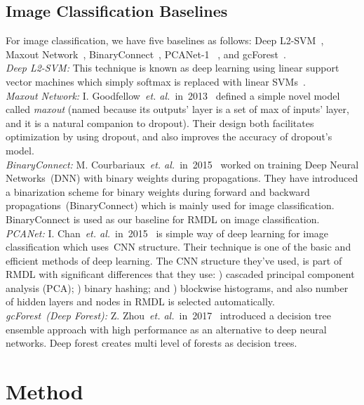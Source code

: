 \documentclass[sigconf, final]{acmart}
\newcommand{\RNum}[1]{%
  \textup{\uppercase\expandafter{\romannumeral#1}}%
}
\begin{document}
\vspace{-0.1in}\subsection{Image Classification Baselines}\label{subsec:baseline_image}
For image classification, we have five baselines as follows: Deep L2-SVM~\cite{tang2013deep}, Maxout Network~\cite{goodfellow2013maxout}, BinaryConnect~\cite{courbariaux2015binaryconnect}, PCANet-1 ~\cite{chan2015pcanet}, and gcForest~\cite{zhou2017deep}.\\
\textit{Deep L2-SVM:} This technique is known as deep learning using linear support vector machines which simply softmax is replaced with linear SVMs~\cite{tang2013deep}.
\\ \textit{Maxout Network:} I. Goodfellow~\textit{et. al.}~in~2013~\cite{goodfellow2013maxout} defined a simple novel model called \textit{maxout} (named because its outputs' layer is a set of max of inputs' layer, and it is a natural companion to dropout). Their design both facilitates optimization by using dropout, and also improves the accuracy of dropout's model.\\
\textit{BinaryConnect:} M. Courbariaux~\textit{et. al.}~in~2015~\cite{courbariaux2015binaryconnect} worked on training Deep Neural Networks~(DNN) with binary weights during propagations. They have introduced a binarization scheme for binary weights during forward and backward propagations~(\textup{BinaryConnect}) which is mainly used for image classification. BinaryConnect is used as our baseline for RMDL on image classification.\\ \textit{PCANet:} I. Chan~\textit{et. al.}~in~2015~\cite{chan2015pcanet} is simple way of deep learning for image classification which uses~CNN structure. Their technique is one of the basic and efficient methods of deep learning. The CNN structure they've used, is part of RMDL with significant differences that they use: \RNum{1}) cascaded principal component analysis (PCA); \RNum{2}) binary hashing; and  \RNum{3}) blockwise histograms, and also number of hidden layers and nodes in RMDL is selected automatically.\\ \textit{gcForest~(Deep Forest):} Z. Zhou~\textit{et. al.}~in~2017~\cite{zhou2017deep} introduced a decision tree ensemble approach with high performance as an alternative to deep neural networks. Deep forest creates multi level of forests as decision trees.  

\section{Method}\label{method}\label{sec:method}
\end{document}

